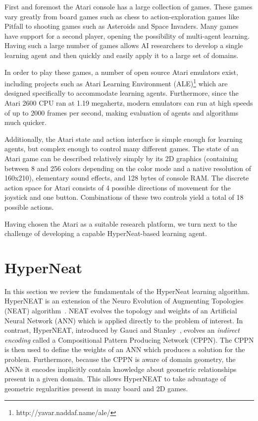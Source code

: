 \documentclass{acm_proc_article-sp}
\begin{document}
First and foremost the Atari console has a large collection of games. These games vary greatly from board games such as chess to action-exploration games like Pitfall to shooting games such as Asteroids and Space Invaders. Many games have support for a second player, opening the possibility of multi-agent learning. Having such a large number of games allows AI researchers to develop a single learning agent and then quickly and easily apply it to a large set of domains.

In order to play these games, a number of open source Atari emulators exist, including projects such as Atari Learning Environment (ALE)\footnote{http://yavar.naddaf.name/ale/} which are designed specifically to accommodate learning agents. Furthermore, since the Atari 2600 CPU ran at 1.19 megahertz, modern emulators can run at high speeds of up to 2000 frames per second, making evaluation of agents and algorithms much quicker.

Additionally, the Atari state and action interface is simple enough for learning agents, but complex enough to control many different games. The state of an Atari game can be described relatively simply by its 2D graphics (containing between 8 and 256 colors depending on the color mode and a native resolution of 160x210), elementary sound effects, and 128 bytes of console RAM. The discrete action space for Atari consists of 4 possible directions of movement for the joystick and one button. Combinations of these two controls yield a total of 18 possible actions.

Having chosen the Atari as a suitable research platform, we turn next to the challenge of developing a capable HyperNeat-based learning agent.

\section{HyperNeat}
\label{sec:hyperneat}
In this section we review the fundamentals of the HyperNeat learning algorithm. HyperNEAT is an extension of the Neuro Evolution of Augmenting Topologies (NEAT) algorithm~\cite{stanley02}. NEAT evolves the topology and weights of an Artificial Neural Network (ANN) which is applied directly to the problem of interest. In contrast, HyperNEAT, introduced by Gauci and Stanley~\cite{gauci08}, evolves an \emph{indirect encoding} called a Compositional Pattern Producing Network (CPPN). The CPPN is then used to define the weights of an ANN which produces a solution for the problem. Furthermore, because the CPPN is aware of domain geometry, the ANNs it encodes implicitly contain knowledge about geometric relationships present in a given domain. This allows HyperNEAT to take advantage of geometric regularities present in many board and 2D games.
\end{document}
